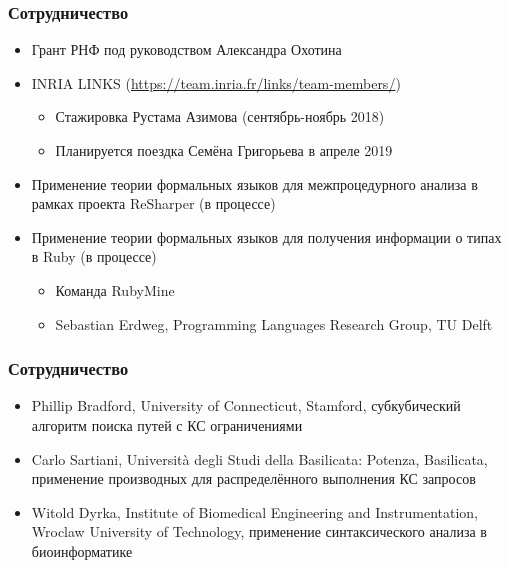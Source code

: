 \documentclass[xcolor=table]{beamer}
\begin{document}
\begin{frame}[fragile]
  \transwipe[direction=90]
  \frametitle{Сотрудничество}
\begin{itemize}
      \item Грант РНФ под руководством Александра Охотина
      \item INRIA LINKS (\url{https://team.inria.fr/links/team-members/})
      \begin{itemize}
         \item Стажировка Рустама Азимова (сентябрь-ноябрь 2018)
         \item Планируется поездка Семёна Григорьева в апреле 2019
      \end{itemize}
      \item Применение теории формальных языков для межпроцедурного анализа в рамках проекта ReSharper (в процессе)
      \item Применение теории формальных языков для получения информации о типах в Ruby (в процессе)
      \begin{itemize}
         \item Команда RubyMine
         \item Sebastian Erdweg, Programming Languages Research Group, TU Delft
      \end{itemize}
      
\end{itemize}
\end{frame}

\begin{frame}[fragile]
  \transwipe[direction=90]
  \frametitle{Сотрудничество}
\begin{itemize}
      \item Phillip Bradford, University of Connecticut, Stamford, субкубический алгоритм поиска путей с КС ограничениями
      \item Carlo Sartiani, Università degli Studi della Basilicata: Potenza, Basilicata, применение производных для распределённого выполнения КС запросов
      \item Witold Dyrka, Institute of Biomedical Engineering and Instrumentation, Wroclaw University of Technology, применение синтаксического анализа в биоинформатике
      
\end{itemize}
\end{frame}
\end{document}
